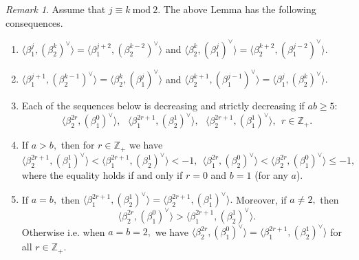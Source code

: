 \documentclass[12pt,reqno]{amsart}
\theoremstyle{plain}
\theoremstyle{definition}
\theoremstyle{remark}
\newtheorem{rem}{Remark}
\newcommand\bz{\mathbb Z}
\begin{document}
\begin{rem}\label{remconseq}
    Assume that $j\equiv k\ \mathrm{mod}\ 2.$ The above Lemma has the following consequences.
\begin{enumerate}
    \item $\langle \beta_1^j,(\beta_2^k)^\vee \rangle=\langle \beta_1^{j+2},(\beta_2^{k-2})^\vee \rangle$ and $\langle \beta_2^k,(\beta_1^j)^\vee \rangle=\langle \beta_2^{k+2},(\beta_1^{j-2})^\vee \rangle.$\vspace{0,2cm}\label{1st}
    \item $\langle \beta_1^{j+1},(\beta_2^{k-1})^\vee \rangle=\langle \beta_2^{k},(\beta_1^{j})^\vee \rangle$ and $\langle \beta_2^{k+1},(\beta_1^{j-1})^\vee \rangle=\langle \beta_1^{j},(\beta_2^{k})^\vee \rangle.$\vspace{0,2cm}\label{2nd}
    \item Each of the sequences below is decreasing and strictly decreasing if $ab\geq 5:$
    $$\langle \beta_2^{2r},(\beta_1^0)^\vee\rangle,\ \ \ \langle \beta_1^{2r+1},(\beta_2^1)^\vee\rangle,\ \ \ \langle \beta_2^{2r+1},(\beta_1^1)^\vee\rangle,\ \ r\in\bz_+.$$\label{3rd}
    \item If $a>b,$ then for $r\in\bz_+$ we have
    $$\langle \beta_2^{2r+1},(\beta_1^1)^\vee\rangle<\langle \beta_1^{2r+1},(\beta_2^1)^\vee\rangle<-1,\ \ \langle \beta_1^{2r},(\beta_2^0)^\vee\rangle<\langle \beta_2^{2r},(\beta_1^0)^\vee\rangle\le -1,$$ where the equality holds if and only if $r=0$ and $b=1$ (for any $a$).\vspace{0,2cm}\label{4th}
    \item If $a=b,$ then $\langle \beta_1^{2r+1},(\beta_2^1)^\vee\rangle=\langle \beta_2^{2r+1},(\beta_1^1)^\vee\rangle.$ Moreover, if $a\neq 2,$ then $$\langle \beta_2^{2r},(\beta_1^0)^\vee\rangle >\langle \beta_1^{2r+1},(\beta_2^1)^\vee\rangle.$$ Otherwise i.e. when $a=b=2,$ we have $\langle \beta_2^{2r},(\beta_1^0)^\vee\rangle=\langle \beta_1^{2r+1},(\beta_2^1)^\vee\rangle$ for all $r\in\bz_+.$ \label{5th}
\end{enumerate}
\end{rem}
\end{document}

